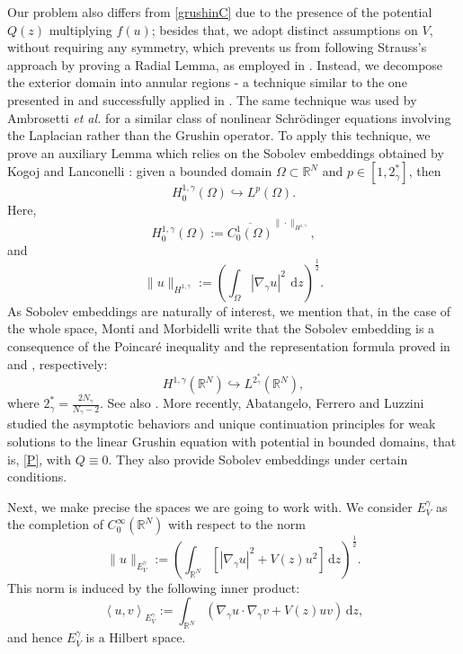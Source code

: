 \documentclass[12pt]{amsart}
\newcommand{\R}{\mathbb{R}}
\begin{document}
Our problem also differs from \eqref{grushinC} due to the presence of the potential $Q(z)$ multiplying $f(u)$; besides that, we adopt distinct assumptions on $V$, without requiring any symmetry, which prevents us from following Strauss's approach  \cite{Strauss} by proving a Radial Lemma, as employed in \cite{Su-Wa-Wi-07}. Instead, we decompose the exterior domain into annular regions - a technique similar to the one presented in \cite{OK-90} and successfully applied in \cite{Carvalho-Furtado-Medeiros-AMPA,Car-Fu-Me-22}. The same technique was used by Ambrosetti \textit{et al.} \cite{Amb-Fel-Mal-04} for a similar class of nonlinear Schrödinger equations involving the Laplacian rather than the Grushin operator. To apply this technique, we prove an auxiliary Lemma which relies on the Sobolev embeddings obtained by Kogoj and Lanconelli \cite{Kogoj-Lan-12}: given a bounded domain $\Omega \subset \R^N$ and $p\in [1,2^*_\gamma]$, then
\begin{equation*}
H_0^{1,\gamma}(\Omega) \hookrightarrow L^p(\Omega).
\end{equation*}
Here, 
$$H_0^{1,\gamma}(\Omega) :=  \overline{C_0^1(\Omega)}^{\| \cdot \|_{H^{1,\gamma}}},$$
and
\begin{equation}\label{norm}
	\|u\|_{H^{1,\gamma}} :=  \left(\int_{\Omega} |\nabla_\gamma u|^2\ \,\mathrm{d}z\right)^{\frac{1}{2}} . 
\end{equation}
As Sobolev embeddings are naturally of interest, we mention that, in the case of the whole space, Monti and Morbidelli \cite{Mo-Mo-06} write that the Sobolev embedding is a consequence of the Poincaré inequality and the representation formula proved in \cite{Fr-La-83} and \cite{FLW-96}, respectively:
\begin{equation}\label{monti}
    H^{1,\gamma}\left(\mathbb{R}^N\right) \hookrightarrow L^{2_\gamma^*}\left(\mathbb{R}^N\right) ,
\end{equation}
where $2_\gamma^*=\frac{2 N_\gamma}{N_\gamma-2}$. See also \cite{Monti06}. More recently, Abatangelo, Ferrero and Luzzini \cite{Ab-Fe-Luz-25} studied the asymptotic behaviors and unique continuation principles for weak solutions to the linear Grushin equation with potential in bounded domains, that is, \eqref{P}, with $Q\equiv0$. They also provide Sobolev embeddings under certain conditions.




Next, we make precise the spaces we are going to work with. We consider $E^\gamma_V$ as the completion of $C_0^\infty(\mathbb{R}^N)$ with respect to the norm
$$
\|u\|_{E^\gamma_V} := \left(\int_{\mathbb{R}^N}\left[|\nabla_\gamma u|^2 + V(z)u^2\right]\,\mathrm{d}z \right)^{\frac{1}{2}}.
$$
This norm is induced by the following inner product:
\[
\left\langle u, v\right\rangle_{E_V^\gamma}:=\int_{\mathbb{R}^N}\left(\nabla_\gamma u \cdot \nabla_\gamma v + V(z)uv\right)\,\mathrm{d}z,
\]
and hence $E^\gamma_V$ is a Hilbert space.
\end{document}
